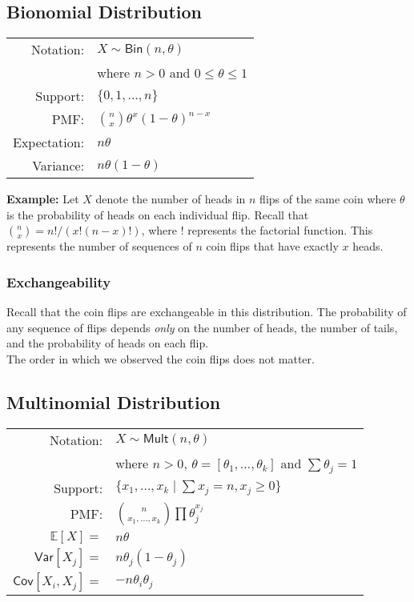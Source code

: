 \documentclass[twoside]{article}
\def\Cov{\textsf{Cov}} %
\def\Bin{\textsf{Bin}} %
\def\Mult{\textsf{Mult}} %
\def\Var{\textsf{Var}} %
\begin{document}
\subsection*{Bionomial Distribution}
\begin{flushleft}
\def\arraystretch{1.1}
\begin{tabular}{rl}
Notation: & $X\sim \Bin(n,\theta)$\\
& where $n > 0$ and $0 \leq \theta \leq 1$\\
Support:  & $\{0,1,\ldots,n\}$\\ 
PMF:   & ${n \choose x}\theta^x(1 - \theta)^{n-x}$\\ 
Expectation:  & $n \theta$\\
Variance:  &  $n \theta(1-\theta)$
\end{tabular}
\end{flushleft}
{\bf Example:} Let $X$ denote the number of heads in $n$ flips of the same coin where $\theta$ is the probability of heads on each individual flip. Recall that ${n \choose x} = n!/ (x!(n-x)!)$, where $!$ represents the factorial function. This represents the number of sequences of $n$ coin flips that have exactly $x$ heads.

\subsubsection*{Exchangeability}
Recall that the coin flips are exchangeable in this distribution. The probability of any sequence of flips depends \emph{only} on the number of heads, the number of tails, and the probability of heads on each flip.\\
The order in which we observed the coin flips does not matter.

\subsection*{Multinomial Distribution}
\begin{flushleft}
\def\arraystretch{1.1}
\begin{tabular}{rl}
Notation: & $X\sim \Mult(n,\theta)$\\
& where $n > 0$, $\theta=[\theta_1,\ldots,\theta_k]$ and $\sum \theta_j = 1$\\
Support:  & $\{x_1,\ldots,x_k \mid \sum x_j = n, x_j \geq 0 \}$\\ 
PMF:   & ${n \choose x_1,\ldots,x_k}\prod \theta_j^{x_j}$\\ 
$\mathbb{E}[X]= $  & $n \theta$\\
$\Var[X_j]= $  &  $n \theta_j(1-\theta_j)$\\
$\Cov[X_i,X_j]= $  &  $-n \theta_i\theta_j$
\end{tabular}
\end{flushleft}
\end{document}
